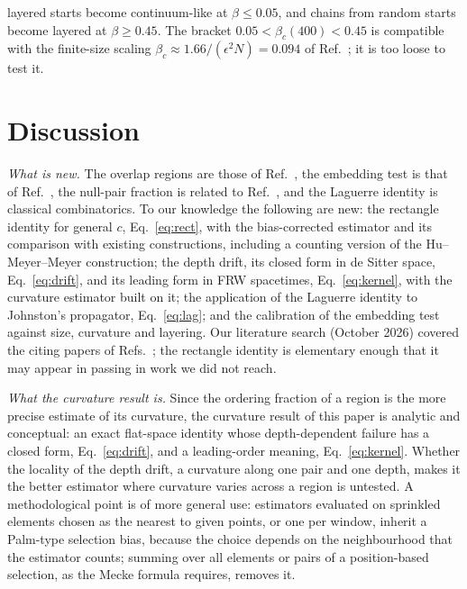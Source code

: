 \documentclass[prd,twocolumn,superscriptaddress,nofootinbib,amsmath,amssymb,floatfix]{revtex4-2}
\begin{document}
layered starts become continuum-like at $\beta\leq0.05$, and chains from random starts become layered at $\beta\geq0.45$. The bracket $0.05<\beta_c(400)<0.45$ is compatible with the finite-size scaling $\beta_c\approx1.66/(\epsilon^2N)=0.094$ of Ref.~\cite{GOS18}; it is too loose to test it.

\section{Discussion}\label{sec:disc}
\emph{What is new.} The overlap regions are those of Ref.~\cite{BK24}, the embedding test is that of Ref.~\cite{CloughEvans16}, the null-pair fraction is related to Ref.~\cite{GlaserSurya13}, and the Laguerre identity is classical combinatorics. To our knowledge the following are new: the rectangle identity for general $c$, Eq.~\eqref{eq:rect}, with the bias-corrected estimator and its comparison with existing constructions, including a counting version of the Hu--Meyer--Meyer construction; the depth drift, its closed form in de Sitter space, Eq.~\eqref{eq:drift}, and its leading form in FRW spacetimes, Eq.~\eqref{eq:kernel}, with the curvature estimator built on it; the application of the Laguerre identity to Johnston's propagator, Eq.~\eqref{eq:lag}; and the calibration of the embedding test against size, curvature and layering. Our literature search (October 2026) covered the citing papers of Refs.~\cite{BK24,CloughEvans16,Johnston08,Johnston09}; the rectangle identity is elementary enough that it may appear in passing in work we did not reach.

\emph{What the curvature result is.} Since the ordering fraction of a region is the more precise estimate of its curvature, the curvature result of this paper is analytic and conceptual: an exact flat-space identity whose depth-dependent failure has a closed form, Eq.~\eqref{eq:drift}, and a leading-order meaning, Eq.~\eqref{eq:kernel}. Whether the locality of the depth drift, a curvature along one pair and one depth, makes it the better estimator where curvature varies across a region is untested. A methodological point is of more general use: estimators evaluated on sprinkled elements chosen as the nearest to given points, or one per window, inherit a Palm-type selection bias, because the choice depends on the neighbourhood that the estimator counts; summing over all elements or pairs of a position-based selection, as the Mecke formula requires, removes it.
\end{document}
